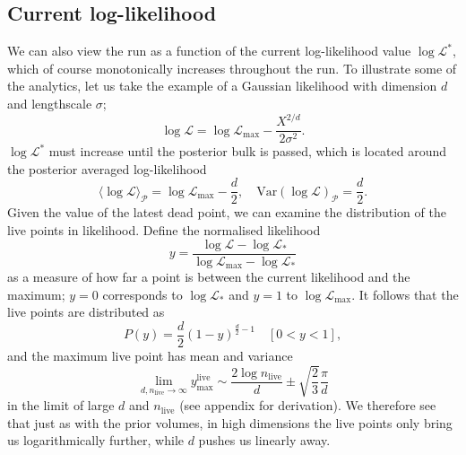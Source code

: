 \documentclass[usenatbib]{mnras}
\newcommand{\nlive}{n_\mathrm{live}}
\begin{document}
\subsection{Current log-likelihood}
We can also view the run as a function of the current log-likelihood value $\log\mathcal{L}^{*}$, which of course monotonically increases throughout the run. To illustrate some of the analytics, let us take the example of a Gaussian likelihood with dimension $d$ and lengthscale $\sigma$;
\begin{equation}\label{eq:logL}
	\log\mathcal{L} = \log\mathcal{L}_\mathrm{max} - \frac{X^{2/d}}{2\sigma^2}.
\end{equation}
$\log \mathcal{L}^{*}$ must increase until the posterior bulk is passed, which is located around the posterior averaged log-likelihood 
\begin{equation}
    \langle\log\mathcal{L}\rangle_\mathcal{P} = \log\mathcal{L}_\mathrm{max} - \frac{d}{2},  \quad \mathrm{Var}(\log\mathcal{L})_\mathcal{P} = \frac{d}{2}.
\end{equation}
Given the value of the latest dead point, we can examine the distribution of the live points in likelihood. Define the normalised likelihood
\begin{equation}
    y = \frac{\log\mathcal{L}-\log\mathcal{L}_*}{\log\mathcal{L}_\mathrm{max}-\log\mathcal{L}_*}
    \label{eq:normalised_likelihood}
\end{equation}
as a measure of how far a point is between the current likelihood and the maximum; $y=0$ corresponds to $\log\mathcal{L}_*$ and $y=1$ to $\log\mathcal{L}_\mathrm{max}$. It follows that the live points are distributed as 
\begin{equation}
    P(y) = \frac{d}{2}(1-y)^{\frac{d}{2}-1} \quad [0<y<1],
    \label{eq:Py}
\end{equation}
and the maximum live point has mean and variance
\begin{equation}\label{eq:ylivemax}
	\lim_{d,\nlive\to\infty} y_\mathrm{max}^\mathrm{live} \sim \frac{2\log \nlive}{d} \pm \sqrt{\frac{2}{3}}\frac{\pi}{d}
\end{equation}
in the limit of large $d$ and $\nlive$ (see appendix for derivation). We therefore see that just as with the prior volumes, in high dimensions the live points only bring us logarithmically further, while $d$ pushes us linearly away.
\end{document}
